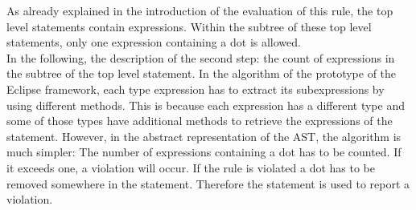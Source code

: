 As already explained in the introduction of the evaluation of this rule, the top level statements contain expressions. Within the subtree of these top level statements, only one expression containing a dot is allowed.
\\

In the following, the description of the second step: the count of expressions in the subtree of the top level statement. In the algorithm of the prototype of the Eclipse framework, each type expression has to extract its subexpressions by using different methods. This is because each expression has a different type and some of those types have additional methods to retrieve the expressions of the statement. However, in the abstract representation of the \ac{AST}, the algorithm is much simpler: The number of expressions containing a dot has to be counted. If it exceeds one, a violation will occur. If the rule is violated a dot has to be removed somewhere in the statement. Therefore the statement is used to report a violation.
\\

